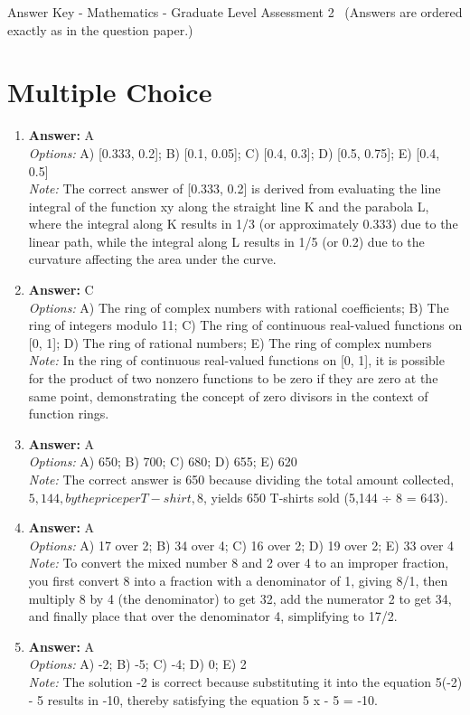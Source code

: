 \documentclass[12pt]{article}
\begin{document}
\begin{center}
Answer Key - Mathematics - Graduate Level Assessment 2 \
\small (Answers are ordered exactly as in the question paper.)
\end{center}

\section*{Multiple Choice}
\begin{enumerate}[label=\arabic*.]
\item \textbf{Answer:} A
\\ \textit{Options:} A) [0.333, 0.2]; B) [0.1, 0.05]; C) [0.4, 0.3]; D) [0.5, 0.75]; E) [0.4, 0.5]
\\ \textit{Note:} The correct answer of [0.333, 0.2] is derived from evaluating the line integral of the function xy along the straight line K and the parabola L, where the integral along K results in 1/3 (or approximately 0.333) due to the linear path, while the integral along L results in 1/5 (or 0.2) due to the curvature affecting the area under the curve.
\item \textbf{Answer:} C
\\ \textit{Options:} A) The ring of complex numbers with rational coefficients; B) The ring of integers modulo 11; C) The ring of continuous real-valued functions on [0, 1]; D) The ring of rational numbers; E) The ring of complex numbers
\\ \textit{Note:} In the ring of continuous real-valued functions on [0, 1], it is possible for the product of two nonzero functions to be zero if they are zero at the same point, demonstrating the concept of zero divisors in the context of function rings.
\item \textbf{Answer:} A
\\ \textit{Options:} A) 650; B) 700; C) 680; D) 655; E) 620
\\ \textit{Note:} The correct answer is 650 because dividing the total amount collected, $5,144, by the price per T-shirt, $8, yields 650 T-shirts sold (5,144 ÷ 8 = 643).
\item \textbf{Answer:} A
\\ \textit{Options:} A) 17 over 2; B) 34 over 4; C) 16 over 2; D) 19 over 2; E) 33 over 4
\\ \textit{Note:} To convert the mixed number 8 and 2 over 4 to an improper fraction, you first convert 8 into a fraction with a denominator of 1, giving 8/1, then multiply 8 by 4 (the denominator) to get 32, add the numerator 2 to get 34, and finally place that over the denominator 4, simplifying to 17/2.
\item \textbf{Answer:} A
\\ \textit{Options:} A) -2; B) -5; C) -4; D) 0; E) 2
\\ \textit{Note:} The solution -2 is correct because substituting it into the equation 5(-2) - 5 results in -10, thereby satisfying the equation 5 x - 5 = -10.
\end{enumerate}
\end{document}
